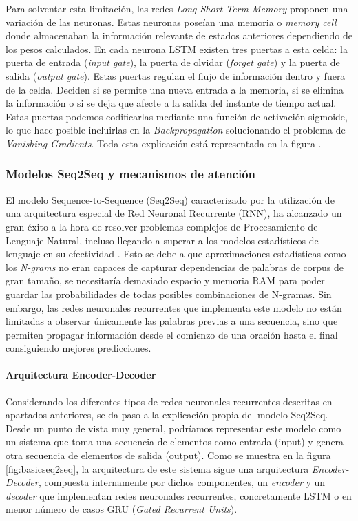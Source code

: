 Para solventar esta limitación, las redes \textit{Long Short-Term Memory} proponen una variación de las neuronas. Estas neuronas poseían una memoria o \textit{memory cell} donde almacenaban la información relevante de estados anteriores dependiendo de los pesos calculados. En cada neurona LSTM existen tres puertas a esta celda: la puerta de entrada (\textit{input gate}), la puerta de olvidar (\textit{forget gate}) y la puerta de salida (\textit{output gate}). Estas puertas regulan el flujo de información dentro y fuera de la celda. Deciden si se permite una nueva entrada a la memoria, si se elimina la información o si se deja que afecte a la salida del instante de tiempo actual. Estas puertas podemos codificarlas mediante una función de activación sigmoide, lo que hace posible incluirlas en la \textit{Backpropagation} solucionando el problema de \textit{Vanishing Gradients}. Toda esta explicación está representada en la figura .


\subsubsection{Modelos Seq2Seq y mecanismos de atención}
El modelo Sequence-to-Sequence (Seq2Seq) caracterizado por la utilización de una arquitectura especial de Red Neuronal Recurrente (RNN), ha alcanzado un gran éxito a la hora de resolver problemas complejos de Procesamiento de Lenguaje Natural, incluso llegando a superar a los modelos estadísticos de lenguaje en su efectividad \citep{analytics_vidhya_2020}. Esto se debe a que aproximaciones estadísticas como los \textit{N-grams} no eran capaces de capturar dependencias de palabras de corpus de gran tamaño, se necesitaría demasiado espacio y memoria RAM para poder guardar las probabilidades de todas posibles combinaciones de N-gramas. Sin embargo, las redes neuronales recurrentes que implementa este modelo no están limitadas a observar únicamente las palabras previas a una secuencia, sino que permiten propagar información desde el comienzo de una oración hasta el final consiguiendo mejores predicciones.

\paragraph{Arquitectura Encoder-Decoder}\hfill


Considerando los diferentes tipos de redes neuronales recurrentes descritas en apartados anteriores, se da paso a la explicación propia del modelo Seq2Seq. Desde un punto de vista muy general, podríamos representar este modelo como un sistema que toma una secuencia de elementos como entrada (input) y genera otra secuencia de elementos de salida (output). Como se muestra en la figura \ref{fig:basicseq2seq}, la arquitectura de este sistema sigue una arquitectura \textit{Encoder-Decoder}, compuesta internamente por dichos componentes, un \textit{encoder} y un \textit{decoder} que implementan redes neuronales recurrentes, concretamente LSTM o en menor número de casos GRU (\textit{Gated Recurrent Units}).


